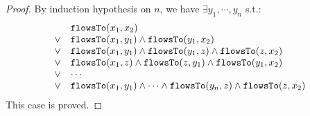 \documentclass[a4paper,11pt]{article}
\begin{document}
\begin{proof}
By induction hypothesis on $n$, we have $\exists y_1, \cdots, y_n$ s.t.:
\[
\begin{array}{ll}
			& \mathtt{flowsTo}(x_1, x_2) \\
	\lor 	& \mathtt{flowsTo}(x_1, y_1) \land \mathtt{flowsTo}(y_1, x_2)\\
	\lor 	& \mathtt{flowsTo}(x_1, y_1) \land \mathtt{flowsTo}(y_1, z) \land \mathtt{flowsTo}(z, x_2) \\
	\lor 	& \mathtt{flowsTo}(x_1, z) \land \mathtt{flowsTo}(z, y_1) \land \mathtt{flowsTo}(y_1, x_2) \\
	\lor 	& \cdots \\
	\lor 	& \mathtt{flowsTo}(x_1, y_1) \land \cdots \land \mathtt{flowsTo}(y_n, z) \land \mathtt{flowsTo}(z, x_2) \\
\end{array}
\]
This case is proved.


\end{proof}
\end{document}
